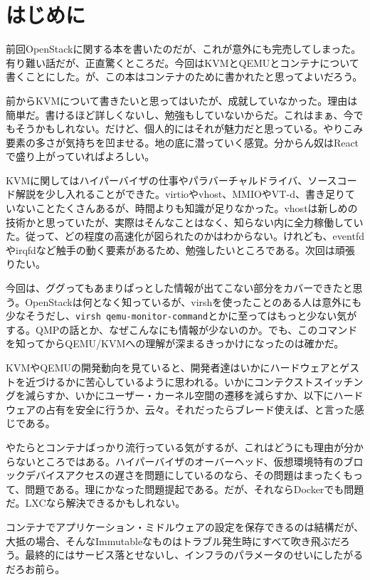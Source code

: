 ﻿\documentclass[9pt,b5paper,tombo,openany]{jsbook}
\begin{document}
\chapter{はじめに}

\setcounter{page}{1}

前回OpenStackに関する本を書いたのだが、これが意外にも完売してしまった。有り難い話だが、正直驚くところだ。今回はKVMとQEMUとコンテナについて書くことにした。が、この本はコンテナのために書かれたと思ってよいだろう。

前からKVMについて書きたいと思ってはいたが、成就していなかった。理由は簡単だ。書けるほど詳しくないし、勉強もしていないからだ。これはまぁ、今でもそうかもしれない。だけど、個人的にはそれが魅力だと思っている。やりこみ要素の多さが気持ちを凹ませる。地の底に潜っていく感覚。分からん奴はReactで盛り上がっていればよろしい。

KVMに関してはハイパーバイザの仕事やパラバーチャルドライバ、ソースコード解説を少し入れることができた。virtioやvhost、MMIOやVT-d、書き足りていないことたくさんあるが、時間よりも知識が足りなかった。vhostは新しめの技術かと思っていたが、実際はそんなことはなく、知らない内に全力稼働していた。従って、どの程度の高速化が図られたのかはわからない。けれども、eventfdやirqfdなど触手の動く要素があるため、勉強したいところである。次回は頑張りたい。

今回は、ググってもあまりぱっとした情報が出てこない部分をカバーできたと思う。OpenStackは何となく知っているが、virshを使ったことのある人は意外にも少なそうだし、\verb|virsh qemu-monitor-command|とかに至ってはもっと少ない気がする。QMPの話とか、なぜこんなにも情報が少ないのか。でも、このコマンドを知ってからQEMU/KVMへの理解が深まるきっかけになったのは確かだ。

KVMやQEMUの開発動向を見ていると、開発者達はいかにハードウェアとゲストを近づけるかに苦心しているように思われる。いかにコンテクストスイッチングを減らすか、いかにユーザー・カーネル空間の遷移を減らすか、以下にハードウェアの占有を安全に行うか、云々。それだったらブレード使えば、と言った感じである。

やたらとコンテナばっかり流行っている気がするが、これはどうにも理由が分からないところではある。ハイパーバイザのオーバーヘッド、仮想環境特有のブロックデバイスアクセスの遅さを問題にしているのなら、その問題はまったくもって、問題である。理にかなった問題提起である。だが、それならDockerでも問題だ。LXCなら解決できるかもしれない。

コンテナでアプリケーション・ミドルウェアの設定を保存できるのは結構だが、大抵の場合、そんなImmutableなものはトラブル発生時にすべて吹き飛ぶだろう。最終的にはサービス落とせないし、インフラのパラメータのせいにしたがるだろお前ら。
\end{document}
